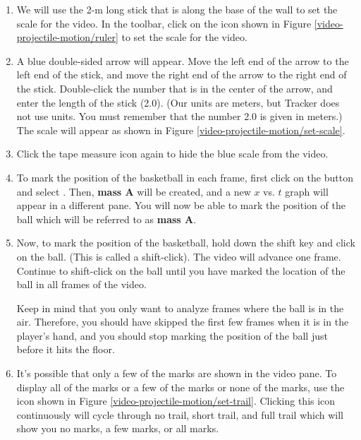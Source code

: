 \begin{enumerate}
		
	\item We will use the 2-m long stick that is along the base of the wall to set the scale for the video.  In the toolbar, click on the  icon shown in Figure \ref{video-projectile-motion/ruler} to set the scale for the video.
		

	\item A blue double-sided arrow will appear. Move the left end of the arrow to the left end of the stick, and move the right end of the arrow to the right end of the stick. Double-click the number that is in the center of the arrow, and enter the length of the stick (2.0). (Our units are meters, but Tracker does not use units. You must remember that the number 2.0 is given in meters.) The scale will appear as shown in Figure \ref{video-projectile-motion/set-scale}.


	\item Click the tape measure icon again to hide the blue scale from the video.
	
	\item To mark the position of the basketball in each frame, first click on the  button and select . Then, {\bf mass A} will be created, and a new $x$ vs. $t$ graph will appear in a different pane. You will now be able to mark the position of the ball which will be referred to as {\bf mass A}.

	\item Now, to mark the position of the basketball, hold down the shift key and click on the ball. (This is called a shift-click). The video will advance one frame. Continue to shift-click on the ball until you have marked the location of the ball in all frames of the video.
	
	Keep in mind that you only want to analyze frames where the ball is in the air. Therefore, you should have skipped the first few frames when it is in the player's hand, and you should stop marking the position of the ball just before it hits the floor.
	
		\item It's possible that only a few of the marks are shown in the video pane. To display all of the marks or a few of the marks or none of the marks, use the  icon shown in Figure \ref{video-projectile-motion/set-trail}. Clicking this icon continuously will cycle through no trail, short trail, and full trail which will show you no marks, a few marks, or all marks. 


\end{enumerate}
